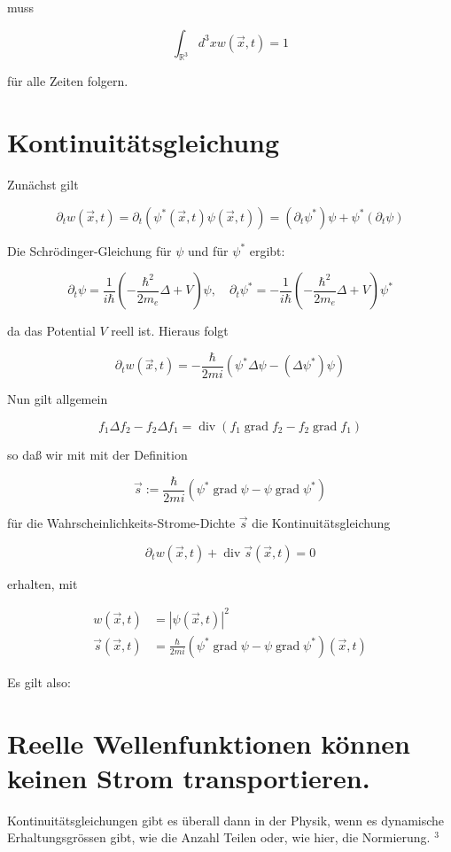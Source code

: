 \documentclass[10pt, letterpaper]{article}
\begin{document}
muss

$$
\int_{\mathbb{R}^{3}} d^{3} x w(\vec{x}, t)=1
$$

für alle Zeiten folgern.

\section*{Kontinuitätsgleichung}
Zunächst gilt

$$
\partial_{t} w(\vec{x}, t)=\partial_{t}\left(\psi^{*}(\vec{x}, t) \psi(\vec{x}, t)\right)=\left(\partial_{t} \psi^{*}\right) \psi+\psi^{*}\left(\partial_{t} \psi\right)
$$

Die Schrödinger-Gleichung für $\psi$ und für $\psi^{*}$ ergibt:

$$
\partial_{t} \psi=\frac{1}{i \hbar}\left(-\frac{\hbar^{2}}{2 m_{e}} \Delta+V\right) \psi, \quad \partial_{t} \psi^{*}=-\frac{1}{i \hbar}\left(-\frac{\hbar^{2}}{2 m_{e}} \Delta+V\right) \psi^{*}
$$

da das Potential $V$ reell ist. Hieraus folgt

$$
\partial_{t} w(\vec{x}, t)=-\frac{\hbar}{2 m i}\left(\psi^{*} \Delta \psi-\left(\Delta \psi^{*}\right) \psi\right)
$$

Nun gilt allgemein

$$
f_{1} \Delta f_{2}-f_{2} \Delta f_{1}=\operatorname{div}\left(f_{1} \operatorname{grad} f_{2}-f_{2} \operatorname{grad} f_{1}\right)
$$

so daß wir mit mit der Definition

$$
\vec{s}:=\frac{\hbar}{2 m i}\left(\psi^{*} \operatorname{grad} \psi-\psi \operatorname{grad} \psi^{*}\right)
$$

für die Wahrscheinlichkeits-Strome-Dichte $\vec{s}$ die Kontinuitätsgleichung

$$
\partial_{t} w(\vec{x}, t)+\operatorname{div} \vec{s}(\vec{x}, t)=0
$$

erhalten, mit

$$
\begin{aligned}
w(\vec{x}, t) & =|\psi(\vec{x}, t)|^{2} \\
\vec{s}(\vec{x}, t) & =\frac{\hbar}{2 m i}\left(\psi^{*} \operatorname{grad} \psi-\psi \operatorname{grad} \psi^{*}\right)(\vec{x}, t)
\end{aligned}
$$

Es gilt also:

\section*{Reelle Wellenfunktionen können keinen Strom transportieren.}
Kontinuitätsgleichungen gibt es überall dann in der Physik, wenn es dynamische Erhaltungsgrössen gibt, wie die Anzahl Teilen oder, wie hier, die Normierung. ${ }^{3}$
\end{document}

